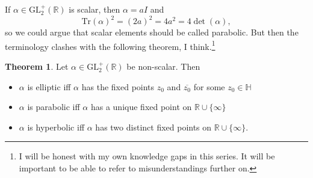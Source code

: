 \documentclass{article}
\theoremstyle{definition}
\newtheorem{theo}{Theorem}
\begin{document}
If $\alpha\in\mathrm{GL}_2^+(\mathbb{R})$ is scalar, then $\alpha=aI$ and
\[\mathrm{Tr}(\alpha)^2=(2a)^2=4a^2=4\det(\alpha),\]
so we could argue that scalar elements should be called parabolic. But then the terminology clashes with the following theorem, I think.\footnote{I will be honest with my own knowledge gaps in this series. It will be important to be able to refer to misunderstandings further on.}
\begin{theo}
	Let $\alpha\in\mathrm{GL}_2^+(\mathbb{R})$ be non-scalar. Then
	\begin{itemize}
		\item $\alpha$ is elliptic iff $\alpha$ has the fixed points $z_0$ and $\overline{z_0}$ for some $z_0\in\mathbb{H}$
		\item $\alpha$ is parabolic iff $\alpha$ has a unique fixed point on $\mathbb{R}\cup\{\infty\}$
		\item $\alpha$ is hyperbolic iff $\alpha$ has two distinct fixed points on $\mathbb{R}\cup\{\infty\}$.
	\end{itemize}
\end{theo}
\end{document}
